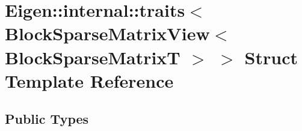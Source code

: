 \hypertarget{struct_eigen_1_1internal_1_1traits_3_01_block_sparse_matrix_view_3_01_block_sparse_matrix_t_01_4_01_4}{}\section{Eigen\+:\+:internal\+:\+:traits$<$ Block\+Sparse\+Matrix\+View$<$ Block\+Sparse\+MatrixT $>$ $>$ Struct Template Reference}
\label{struct_eigen_1_1internal_1_1traits_3_01_block_sparse_matrix_view_3_01_block_sparse_matrix_t_01_4_01_4}
\subsection*{Public Types}
